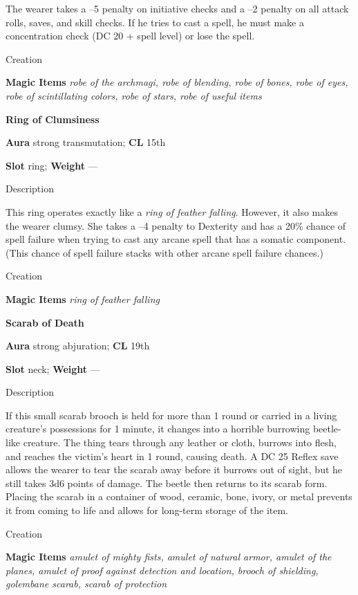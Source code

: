 The wearer takes a --5 penalty on initiative checks and a --2 penalty on all attack rolls, saves, and skill checks. If he tries to cast a spell, he must make a concentration check (DC 20 + spell level) or lose the spell. 
				
Creation
				
\textbf{Magic Items}\textit{ robe of the archmagi, robe of blending, robe of bones, robe of eyes, robe of scintillating colors, robe of stars, robe of useful items}
				
\textbf{Ring of Clumsiness}
				
\textbf{Aura} strong transmutation; \textbf{CL} 15th
				
\textbf{Slot} ring; \textbf{Weight }---
				
Description
				
This ring operates exactly like a \textit{ring of feather falling}. However, it also makes the wearer clumsy. She takes a --4 penalty to Dexterity and has a 20\% chance of spell failure when trying to cast any arcane spell that has a somatic component. (This chance of spell failure stacks with other arcane spell failure chances.) 
				
Creation
				
\textbf{Magic Items}\textit{ ring of feather falling}
				
\textbf{Scarab of Death}
				
\textbf{Aura} strong abjuration; \textbf{CL} 19th
				
\textbf{Slot} neck; \textbf{Weight }---
				
Description
				
If this small scarab brooch is held for more than 1 round or carried in a living creature's possessions for 1 minute, it changes into a horrible burrowing beetle-like creature. The thing tears through any leather or cloth, burrows into flesh, and reaches the victim's heart in 1 round, causing death. A DC 25 Reflex save allows the wearer to tear the scarab away before it burrows out of sight, but he still takes 3d6 points of damage. The beetle then returns to its scarab form. Placing the scarab in a container of wood, ceramic, bone, ivory, or metal prevents it from coming to life and allows for long-term storage of the item. 
				
Creation
				
\textbf{Magic Items}\textit{ amulet of mighty fists, amulet of natural armor, amulet of the planes, amulet of proof against detection and location, brooch of shielding, golembane scarab, scarab of protection}
				
